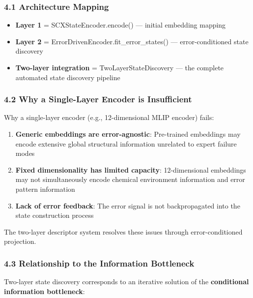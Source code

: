 \documentclass[
  12pt,
]{article}
\providecommand{\tightlist}{%
  \setlength{\itemsep}{0pt}\setlength{\parskip}{0pt}}
\begin{document}
\subsubsection{4.1 Architecture Mapping}\label{architecture-mapping}

\begin{itemize}
\tightlist
\item
  \textbf{Layer 1} = SCXStateEncoder.encode() --- initial embedding mapping
\item
  \textbf{Layer 2} = ErrorDrivenEncoder.fit\_error\_states() ---
  error-conditioned state discovery
\item
  \textbf{Two-layer integration} = TwoLayerStateDiscovery --- the complete automated state discovery pipeline
\end{itemize}

\subsubsection{4.2 Why a Single-Layer Encoder is Insufficient}\label{why-single-layer-insufficient}

Why a single-layer encoder (e.g., 12-dimensional MLIP encoder) fails:

\begin{enumerate}
\def\labelenumi{\arabic{enumi}.}
\tightlist
\item
  \textbf{Generic embeddings are error-agnostic}: Pre-trained embeddings may encode extensive global structural information unrelated to expert failure modes
\item
  \textbf{Fixed dimensionality has limited capacity}: 12-dimensional embeddings may not simultaneously encode chemical environment information and error pattern information
\item
  \textbf{Lack of error feedback}: The error signal is not backpropagated into the state construction process
\end{enumerate}

The two-layer descriptor system resolves these issues through error-conditioned projection.

\subsubsection{4.3 Relationship to the Information Bottleneck}\label{relationship-info-bottleneck}

Two-layer state discovery corresponds to an iterative solution of the \textbf{conditional information bottleneck}:
\end{document}
